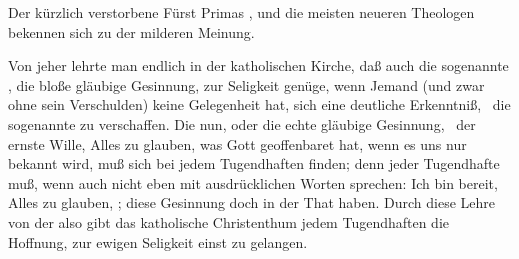 \begin{aufza}
\begin{aufzc}
\item Der kürzlich verstorbene Fürst Primas , und die meisten neueren Theologen bekennen sich zu der milderen Meinung.
\item Von jeher lehrte man endlich in der katholischen Kirche, daß auch die sogenannte , die bloße gläubige Gesinnung, zur Seligkeit genüge, wenn Jemand (und zwar ohne sein Verschulden) keine Gelegenheit hat, sich eine deutliche Erkenntniß, \dh\ die sogenannte  zu verschaffen. Die  nun, oder die echte gläubige Gesinnung, \dh\ der ernste Wille, Alles zu glauben, was Gott geoffenbaret hat, wenn es uns nur bekannt wird, muß sich bei jedem Tugendhaften finden; denn jeder Tugendhafte muß, wenn auch nicht eben mit ausdrücklichen Worten sprechen: Ich bin bereit, Alles zu glauben, \usw ; diese Gesinnung doch in der That haben. Durch diese Lehre von der  also gibt das katholische Christenthum jedem Tugendhaften die Hoffnung, zur ewigen Seligkeit einst zu gelangen.
\end{aufzc}
\end{aufza}

